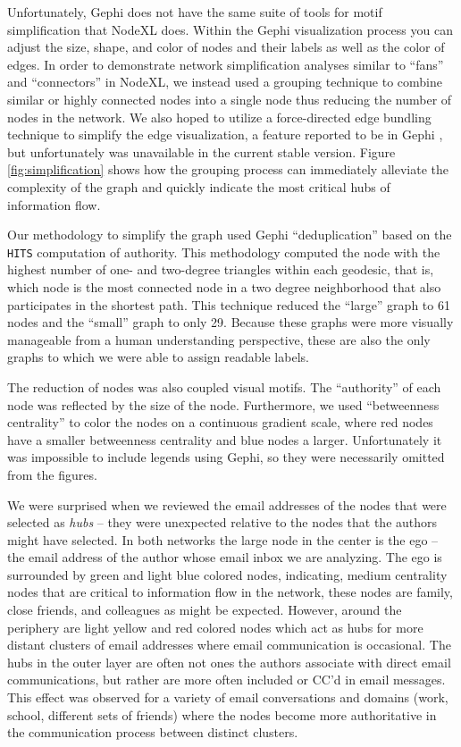 \documentclass[11pt,letterpaper]{article}
\begin{document}
Unfortunately, Gephi does not have the same suite of tools for motif simplification that NodeXL does. Within the Gephi visualization process you can adjust the size, shape, and color of nodes and their labels as well as the color of edges. In order to demonstrate network simplification analyses similar to ``fans'' and ``connectors'' in NodeXL, we instead used a grouping technique to combine similar or highly connected nodes into a single node thus reducing the number of nodes in the network. We also hoped to utilize a force-directed edge bundling technique to simplify the edge visualization, a feature reported to be in Gephi \cite{pupyrev_edge_2012,gansner_multilevel_2011}, but unfortunately was unavailable in the current stable version. Figure \ref{fig:simplification} shows how the grouping process can immediately alleviate the complexity of the graph and quickly indicate the most critical hubs of information flow.

Our methodology to simplify the graph used Gephi ``deduplication'' based on the \texttt{HITS} computation of authority. This methodology computed the node with the highest number of one- and two-degree triangles within each geodesic, that is, which node is the most connected node in a two degree neighborhood that also participates in the shortest path. This technique reduced the ``large'' graph to 61 nodes and the ``small'' graph to only 29. Because these graphs were more visually manageable from a human understanding perspective, these are also the only graphs to which we were able to assign readable labels.

The reduction of nodes was also coupled visual motifs. The ``authority'' of each node was reflected by the size of the node. Furthermore, we used ``betweenness centrality'' to color the nodes on a continuous gradient scale, where red nodes have a smaller betweenness centrality and blue nodes a larger. Unfortunately it was impossible to include legends using Gephi, so they were necessarily omitted from the figures.

We were surprised when we reviewed the email addresses of the nodes that were selected as \textit{hubs} -- they were unexpected relative to the nodes that the authors might have selected. In both networks the large node in the center is the ego -- the email address of the author whose email inbox we are analyzing. The ego is surrounded by green and light blue colored nodes, indicating, medium centrality nodes that are critical to information flow in the network, these nodes are family, close friends, and colleagues as might be expected. However, around the periphery are light yellow and red colored nodes which act as hubs for more distant clusters of email addresses where email communication is occasional. The hubs in the outer layer are often not ones the authors associate with direct email communications, but rather are more often included or CC'd in email messages. This effect was observed for a variety of email conversations and domains (work, school, different sets of friends) where the nodes become more authoritative in the communication process between distinct clusters.
\end{document}
